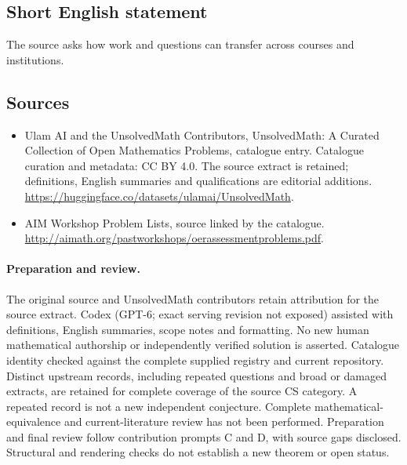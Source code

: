 \documentclass[11pt]{article}
\begin{document}
\subsection{Short English statement}
The source asks how work and questions can transfer across courses and institutions.
\subsection{Sources}
\begin{itemize}
\item[\hypertarget{source:statement:1}{S1}] Ulam AI and the UnsolvedMath Contributors, UnsolvedMath: A Curated Collection of Open Mathematics Problems, catalogue entry. Catalogue curation and metadata: CC BY 4.0. The source extract is retained; definitions, English summaries and qualifications are editorial additions.
\url{https://huggingface.co/datasets/ulamai/UnsolvedMath}.
\item[\hypertarget{source:statement:2}{S2}] AIM Workshop Problem Lists, source linked by the catalogue.
\url{http://aimath.org/pastworkshops/oerassessmentproblems.pdf}.
\end{itemize}
\paragraph{Preparation and review.}
The original source and UnsolvedMath contributors retain attribution for the source extract. Codex (GPT-6; exact serving revision not exposed) assisted with definitions, English summaries, scope notes and formatting. No new human mathematical authorship or independently verified solution is asserted. Catalogue identity checked against the complete supplied registry and current repository. Distinct upstream records, including repeated questions and broad or damaged extracts, are retained for complete coverage of the source CS category. A repeated record is not a new independent conjecture. Complete mathematical-equivalence and current-literature review has not been performed. Preparation and final review follow contribution prompts C and D, with source gaps disclosed. Structural and rendering checks do not establish a new theorem or open status.
\label{end:statement}
\end{document}
